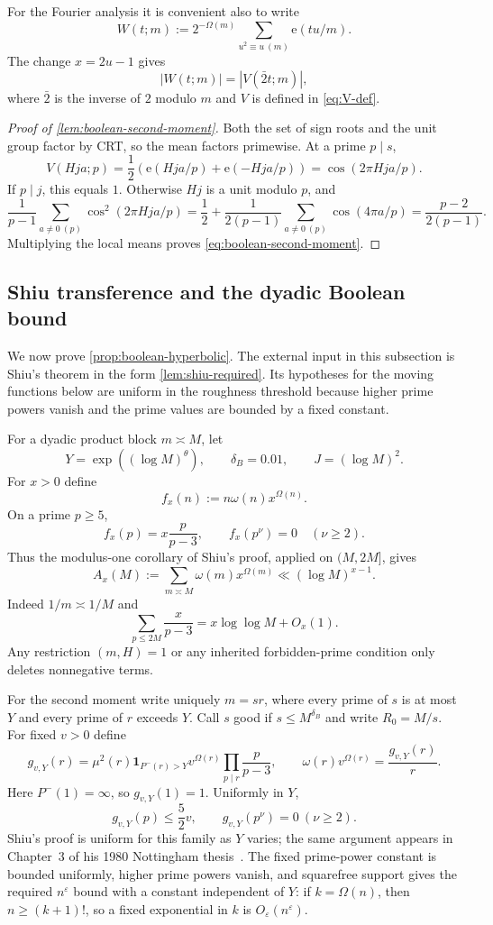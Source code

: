 \documentclass[11pt]{article}
\theoremstyle{definition}
\theoremstyle{remark}
\newcommand{\e}{\mathrm e}
\newcommand{\ep}{\varepsilon}
\newcommand{\1}{\mathbf 1}
\newcommand{\Om}{\Omega}
\newcommand{\om}{\omega}
\begin{document}
For the Fourier analysis it is convenient also to write
\[
W(t;m):=2^{-\Om(m)}\sum_{u^2\equiv u\ (m)}\e(tu/m).
\]
The change $x=2u-1$ gives
\[
|W(t;m)|=|V(\bar2t;m)|,
\]
where $\bar2$ is the inverse of $2$ modulo $m$ and $V$ is defined in \cref{eq:V-def}.

\begin{proof}[Proof of \cref{lem:boolean-second-moment}]
Both the set of sign roots and the unit group factor by CRT, so the mean factors primewise.  At a prime $p\mid s$,
\[
V(Hja;p)=\frac12\left(\e(Hja/p)+\e(-Hja/p)\right)
=\cos(2\pi Hja/p).
\]
If $p\mid j$, this equals $1$.  Otherwise $Hj$ is a unit modulo $p$, and
\[
\frac1{p-1}\sum_{a\ne0\ (p)}\cos^2(2\pi Hja/p)
=\frac12+\frac1{2(p-1)}\sum_{a\ne0\ (p)}\cos(4\pi a/p)
=\frac{p-2}{2(p-1)}.
\]
Multiplying the local means proves \cref{eq:boolean-second-moment}.
\end{proof}

\subsection{Shiu transference and the dyadic Boolean bound}

We now prove \cref{prop:boolean-hyperbolic}.  The external input in this subsection is Shiu's theorem in the form \cref{lem:shiu-required}.  Its hypotheses for the moving functions below are uniform in the roughness threshold because higher prime powers vanish and the prime values are bounded by a fixed constant.

For a dyadic product block $m\asymp M$, let
\[
Y=\exp((\log M)^\theta),\qquad \delta_B=0.01,
\qquad J=(\log M)^2.
\]
For $x>0$ define
\[
f_x(n):=n\om(n)x^{\Om(n)}.
\]
On a prime $p\ge5$,
\[
f_x(p)=x\frac p{p-3},\qquad f_x(p^\nu)=0\quad(\nu\ge2).
\]
Thus the modulus-one corollary of Shiu's proof, applied on $(M,2M]$, gives
\begin{equation}\label{eq:app-Ax}
A_x(M):=\sum_{m\asymp M}\om(m)x^{\Om(m)}
\ll(\log M)^{x-1}.
\end{equation}
Indeed $1/m\asymp1/M$ and
\[
\sum_{p\le2M}\frac{x}{p-3}=x\log\log M+O_x(1).
\]
Any restriction $(m,H)=1$ or any inherited forbidden-prime condition only deletes nonnegative terms.

For the second moment write uniquely $m=sr$, where every prime of $s$ is at most $Y$ and every prime of $r$ exceeds $Y$.  Call $s$ good if $s\le M^{\delta_B}$ and write $R_0=M/s$.  For fixed $v>0$ define
\[
g_{v,Y}(r)
=\mu^2(r)\mathbf1_{P^-(r)>Y}v^{\Om(r)}
 \prod_{p\mid r}\frac p{p-3},
\qquad
\om(r)v^{\Om(r)}=\frac{g_{v,Y}(r)}r.
\]
Here $P^-(1)=\infty$, so $g_{v,Y}(1)=1$.
Uniformly in $Y$,
\[
g_{v,Y}(p)\le\frac52v,\qquad g_{v,Y}(p^\nu)=0\ (\nu\ge2).
\]
Shiu's proof is uniform for this family as $Y$ varies; the same argument appears in Chapter~3 of his 1980 Nottingham thesis~\cite{ShiuThesis1980}.  The fixed prime-power constant is bounded uniformly, higher prime powers vanish, and squarefree support gives the required $n^\ep$ bound with a constant independent of $Y$: if $k=\Om(n)$, then $n\ge(k+1)!$, so a fixed exponential in $k$ is $O_\ep(n^\ep)$.
\end{document}
